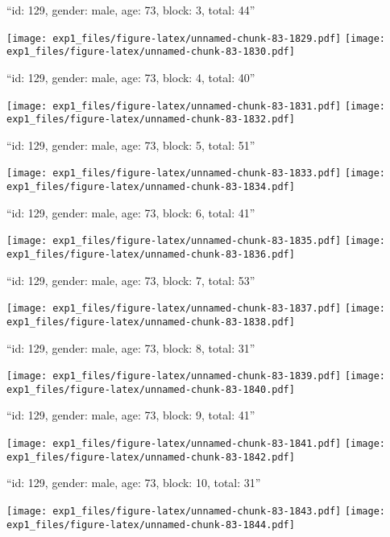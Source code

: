 \documentclass[11pt,,]{article}
\begin{document}
\newpage
[1] 

``id: 129, gender: male, age: 73, block: 3, total: 44''

\texttt{[image: exp1\_files/figure-latex/unnamed-chunk-83-1829.pdf]}
\texttt{[image: exp1\_files/figure-latex/unnamed-chunk-83-1830.pdf]}

\newpage
[1] 

``id: 129, gender: male, age: 73, block: 4, total: 40''

\texttt{[image: exp1\_files/figure-latex/unnamed-chunk-83-1831.pdf]}
\texttt{[image: exp1\_files/figure-latex/unnamed-chunk-83-1832.pdf]}

\newpage
[1] 

``id: 129, gender: male, age: 73, block: 5, total: 51''

\texttt{[image: exp1\_files/figure-latex/unnamed-chunk-83-1833.pdf]}
\texttt{[image: exp1\_files/figure-latex/unnamed-chunk-83-1834.pdf]}

\newpage
[1] 

``id: 129, gender: male, age: 73, block: 6, total: 41''

\texttt{[image: exp1\_files/figure-latex/unnamed-chunk-83-1835.pdf]}
\texttt{[image: exp1\_files/figure-latex/unnamed-chunk-83-1836.pdf]}

\newpage
[1] 

``id: 129, gender: male, age: 73, block: 7, total: 53''

\texttt{[image: exp1\_files/figure-latex/unnamed-chunk-83-1837.pdf]}
\texttt{[image: exp1\_files/figure-latex/unnamed-chunk-83-1838.pdf]}

\newpage
[1] 

``id: 129, gender: male, age: 73, block: 8, total: 31''

\texttt{[image: exp1\_files/figure-latex/unnamed-chunk-83-1839.pdf]}
\texttt{[image: exp1\_files/figure-latex/unnamed-chunk-83-1840.pdf]}

\newpage
[1] 

``id: 129, gender: male, age: 73, block: 9, total: 41''

\texttt{[image: exp1\_files/figure-latex/unnamed-chunk-83-1841.pdf]}
\texttt{[image: exp1\_files/figure-latex/unnamed-chunk-83-1842.pdf]}

\newpage
[1] 

``id: 129, gender: male, age: 73, block: 10, total: 31''

\texttt{[image: exp1\_files/figure-latex/unnamed-chunk-83-1843.pdf]}
\texttt{[image: exp1\_files/figure-latex/unnamed-chunk-83-1844.pdf]}
\end{document}
